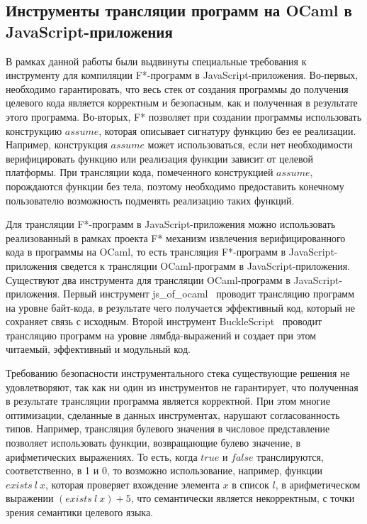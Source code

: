 \subsection{Инструменты трансляции программ на OCaml в JavaScript-приложения}

В рамках данной работы были выдвинуты специальные требования к инструменту для компиляции F*-программ в JavaScript-приложения. Во-первых, необходимо гарантировать, что весь стек от создания программы до получения целевого кода является корректным и безопасным, как и полученная в результате этого программа. Во-вторых, F* позволяет при создании программы использовать конструкцию $assume$, которая описывает сигнатуру функцию без ее реализации. Например, конструкция $assume$ может использоваться, если нет необходимости верифицировать функцию или реализация функции зависит от целевой платформы. При трансляции кода, помеченного конструкцией $assume$, порождаются функции без тела, поэтому необходимо предоставить конечному пользователю возможность подменять реализацию таких функций.

Для трансляции F*-программ в JavaScript-приложения можно использовать реализованный в рамках проекта F* механизм извлечения верифицированного кода в программы на OCaml, то есть трансляция F*-программ в JavaScript-приложения сведется к трансляции OCaml-программ в JavaScript-приложения. Существуют два инструмента для трансляции OCaml-программ в JavaScript-приложения. Первый инструмент js\_of\_ocaml~\cite{ocamljs} проводит трансляцию программ на уровне байт-кода, в результате чего получается эффективный код, который не сохраняет связь с исходным. Второй инструмент BuckleScript~\cite{bucklescript} проводит трансляцию программ на уровне лямбда-выражений и создает при этом читаемый, эффективный и модульный код.

Требованию безопасности инструментального стека существующие решения не удовлетворяют, так как ни один из инструментов не гарантирует, что полученная в результате трансляции программа является корректной. При этом многие оптимизации, сделанные в данных инструментах, нарушают согласованность типов. Например, трансляция булевого значения в числовое представление позволяет использовать функции, возвращающие булево значение, в арифметических выражениях. То есть, когда $true$ и $false$ транслируются, соответственно, в 1 и 0, то  возможно использование, например, функции $exists~l~x$, которая проверяет вхождение элемента $x$ в список $l$, в арифметическом выражении $(exists~l~x) + 5$, что семантически является некорректным, с точки зрения семантики целевого языка. 

